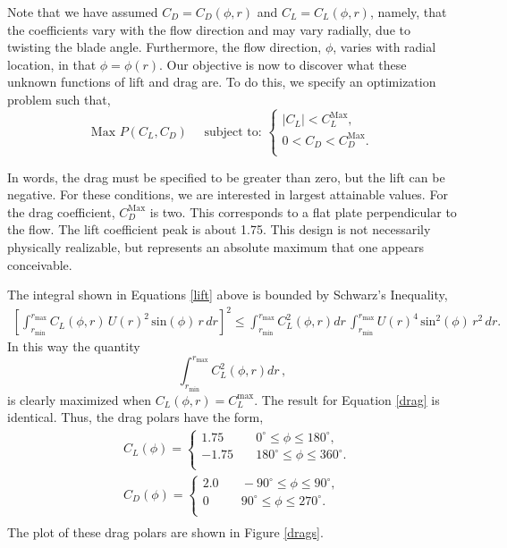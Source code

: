\documentclass{article}
\begin{document}
Note that we have assumed $C_D = C_D(\phi,r)$ and $C_L = C_L(\phi,r)$,
namely, that the coefficients vary with the flow direction and may vary
radially, due to twisting the blade angle. Furthermore, the flow
direction, $\phi$, varies with radial location, in that $\phi=\phi(r)$. 
Our objective is now to discover what these unknown functions of lift
and drag are. To do this, we specify an optimization problem such that, 
\begin{equation*} 
 \text{Max } P(C_L,C_D) \quad \text{ subject to: }
  \begin{cases}
   |C_L| < C_L^{\text{Max}}, \\
   0 < C_D < C_D^{\text{Max}}. \\
  \end{cases}
\end{equation*}

In words, the drag must be specified to be greater than zero, but
the lift can be negative. For these conditions, we are interested in
largest attainable values. For the drag coefficient, $C_D^{\text{Max}}$
is two. %
This corresponds to a flat plate perpendicular to the flow.
The lift coefficient peak is about 1.75. This design is not necessarily
physically realizable, but represents an absolute maximum that one
appears conceivable. 

The integral shown in Equations \ref{lift} above is bounded by 
Schwarz's Inequality,  
\begin{align}
  \left[\int_{r_{\text{min}}}^{r_{\text{max}}} C_L(\phi,r)\, U(r)^2
 \,\text{sin}(\phi)\, r\,dr \right]^2 \le 
 \int_{r_{\text{min}}}^{r_{\text{max}}} C_L^2(\phi,r) dr \,
 \int_{r_{\text{min}}}^{r_{\text{max}}} U(r)^4 
 \,\text{sin}^2(\phi)\, r^2\,dr.
\end{align}
In this way the quantity
\begin{equation}
 \int_{r_{\text{min}}}^{r_{\text{max}}} C_L^2(\phi,r) dr \,, 
\end{equation}
is clearly maximized when $C_L(\phi,r) = C_L^{\text{max}}$. 
The result for Equation \ref{drag} is identical. Thus, the drag polars
have the form, 
\begin{align*} 
 &C_L(\phi) = 
  \begin{cases}
    1.75& \quad 0^{\circ} \le \phi \le 180^{\circ}, \\
   -1.75& \quad 180^{\circ} \le \phi \le 360^{\circ}.  \\
  \end{cases}\\
 &C_D(\phi) = 
  \begin{cases}
    2.0& \quad -90^{\circ} \le \phi \le 90^{\circ}, \\
      0& \quad 90^{\circ} \le \phi \le 270^{\circ}.  \\
  \end{cases}\\
\end{align*}
The plot of these drag polars are shown in Figure \ref{drags}. 
\end{document}
